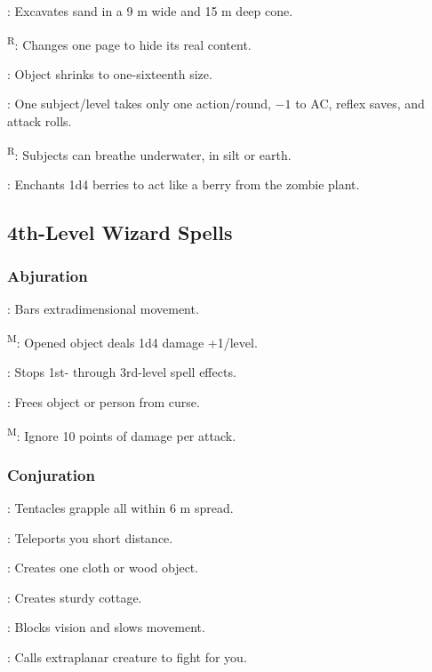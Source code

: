 	: Excavates sand in a 9 m wide and 15 m deep cone. %

	\textsuperscript{R}: Changes one page to hide its real content.

	: Object shrinks to one-sixteenth size.

	: One subject/level takes only one action/round, $-1$ to AC, reflex saves, and attack rolls.

	\textsuperscript{R}: Subjects can breathe underwater, in silt or earth. %

	: Enchants 1d4 berries to act like a berry from the zombie plant. %



\subsection{4th-Level Wizard Spells}

\subsubsection{Abjuration}
	: Bars extradimensional movement.

	\textsuperscript{M}: Opened object deals 1d4 damage +1/level.

	: Stops 1st- through 3rd-level spell effects.

	: Frees object or person from curse.

	\textsuperscript{M}: Ignore 10 points of damage per attack.

\subsubsection{Conjuration}
	: Tentacles grapple all within 6 m spread.

	: Teleports you short distance.

	: Creates one cloth or wood object.

	: Creates sturdy cottage.

	: Blocks vision and slows movement.

	: Calls extraplanar creature to fight for you.

